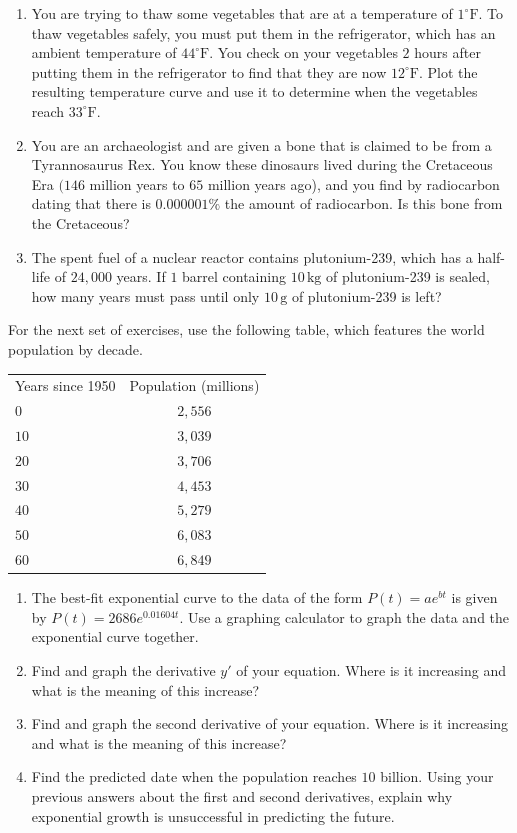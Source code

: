\documentclass{exercises}
\begin{document}
\begin{enumerate}[resume]
\item You are trying to thaw some vegetables that are at a temperature of $1^\circ \text{F}$. To thaw vegetables safely, you must put them in the refrigerator, which has an ambient temperature of $44^\circ \text{F}$. You check on your vegetables $2$ hours after putting them in the refrigerator to find that they are now $12^\circ \text{F}$. Plot the resulting temperature curve and use it to determine when the vegetables reach $33^\circ \text{F}$.
\item You are an archaeologist and are given a bone that is claimed to be from a Tyrannosaurus Rex. You know these dinosaurs lived during the Cretaceous Era $(146$ million years to $65$ million years ago), and you find by radiocarbon dating that there is $0.000001\%$ the amount of radiocarbon. Is this bone from the Cretaceous?
\item The spent fuel of a nuclear reactor contains plutonium-239, which has a half-life of $24{,}000$ years. If $1$ barrel containing $10\,\text{kg}$ of plutonium-239 is sealed, how many years must pass until only $10\,\text{g}$ of plutonium-239 is left?
\end{enumerate}

For the next set of exercises, use the following table, which features the world population by decade.


\begin{center}
\begin{tabular}{lc}
\hline
Years since 1950 & Population (millions) \\
$0$ & $2{,}556$ \\
$10$ & $3{,}039$ \\
$20$ & $3{,}706$ \\
$30$ & $4{,}453$ \\
$40$ & $5{,}279$ \\
$50$ & $6{,}083$ \\
$60$ & $6{,}849$ \\
\hline
\end{tabular}
\end{center}

\begin{enumerate}[resume]
\item \techrequired The best-fit exponential curve to the data of the form $P(t)=ae^{bt}$ is given by $P(t)=2686e^{0.01604t}$. Use a graphing calculator to graph the data and the exponential curve together.
\item \techrequired Find and graph the derivative $y'$ of your equation. Where is it increasing and what is the meaning of this increase?
\item \techrequired Find and graph the second derivative of your equation. Where is it increasing and what is the meaning of this increase?
\item \techrequired Find the predicted date when the population reaches $10$ billion. Using your previous answers about the first and second derivatives, explain why exponential growth is unsuccessful in predicting the future.
\end{enumerate}
\end{document}
